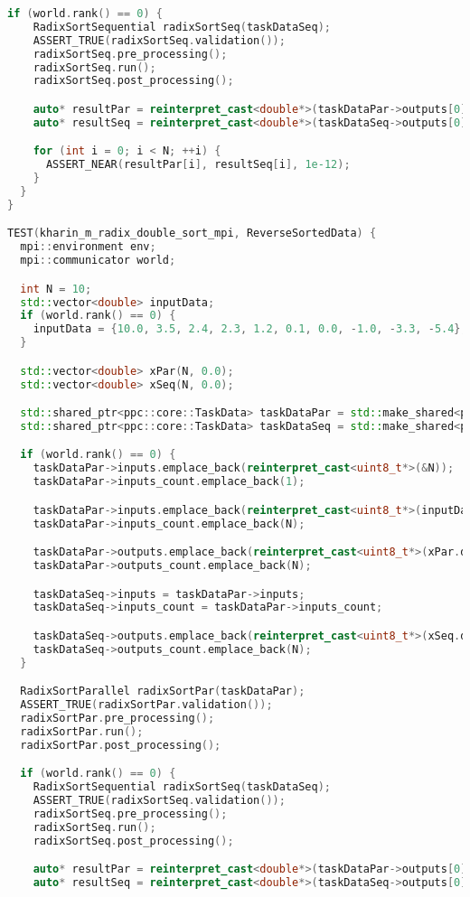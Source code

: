 \documentclass[a4paper,12pt]{article}
\begin{document}
\begin{lstlisting}[language=C++, caption={Тесты}]
  if (world.rank() == 0) {
    RadixSortSequential radixSortSeq(taskDataSeq);
    ASSERT_TRUE(radixSortSeq.validation());
    radixSortSeq.pre_processing();
    radixSortSeq.run();
    radixSortSeq.post_processing();

    auto* resultPar = reinterpret_cast<double*>(taskDataPar->outputs[0]);
    auto* resultSeq = reinterpret_cast<double*>(taskDataSeq->outputs[0]);

    for (int i = 0; i < N; ++i) {
      ASSERT_NEAR(resultPar[i], resultSeq[i], 1e-12);
    }
  }
}

TEST(kharin_m_radix_double_sort_mpi, ReverseSortedData) {
  mpi::environment env;
  mpi::communicator world;

  int N = 10;
  std::vector<double> inputData;
  if (world.rank() == 0) {
    inputData = {10.0, 3.5, 2.4, 2.3, 1.2, 0.1, 0.0, -1.0, -3.3, -5.4};
  }

  std::vector<double> xPar(N, 0.0);
  std::vector<double> xSeq(N, 0.0);

  std::shared_ptr<ppc::core::TaskData> taskDataPar = std::make_shared<ppc::core::TaskData>();
  std::shared_ptr<ppc::core::TaskData> taskDataSeq = std::make_shared<ppc::core::TaskData>();

  if (world.rank() == 0) {
    taskDataPar->inputs.emplace_back(reinterpret_cast<uint8_t*>(&N));
    taskDataPar->inputs_count.emplace_back(1);

    taskDataPar->inputs.emplace_back(reinterpret_cast<uint8_t*>(inputData.data()));
    taskDataPar->inputs_count.emplace_back(N);

    taskDataPar->outputs.emplace_back(reinterpret_cast<uint8_t*>(xPar.data()));
    taskDataPar->outputs_count.emplace_back(N);

    taskDataSeq->inputs = taskDataPar->inputs;
    taskDataSeq->inputs_count = taskDataPar->inputs_count;

    taskDataSeq->outputs.emplace_back(reinterpret_cast<uint8_t*>(xSeq.data()));
    taskDataSeq->outputs_count.emplace_back(N);
  }

  RadixSortParallel radixSortPar(taskDataPar);
  ASSERT_TRUE(radixSortPar.validation());
  radixSortPar.pre_processing();
  radixSortPar.run();
  radixSortPar.post_processing();

  if (world.rank() == 0) {
    RadixSortSequential radixSortSeq(taskDataSeq);
    ASSERT_TRUE(radixSortSeq.validation());
    radixSortSeq.pre_processing();
    radixSortSeq.run();
    radixSortSeq.post_processing();

    auto* resultPar = reinterpret_cast<double*>(taskDataPar->outputs[0]);
    auto* resultSeq = reinterpret_cast<double*>(taskDataSeq->outputs[0]);


\end{lstlisting}
\end{document}
